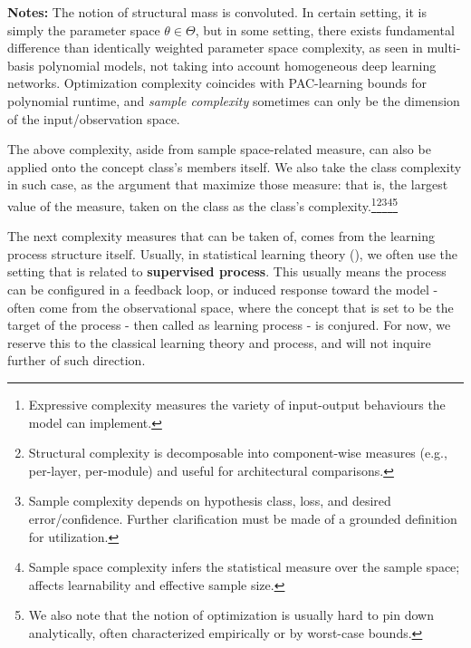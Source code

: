\documentclass[10pt]{article} %
\begin{document}
\begin{table}[htb]
\begin{threeparttable}
    \begin{tablenotes}
      \footnotesize
      \item[] \textbf{Notes:} The notion of structural mass is convoluted. In certain setting, it is simply the parameter space $\theta\in\Theta$, but in some setting, there exists fundamental difference than identically weighted parameter space complexity, as seen in multi-basis polynomial models, not taking into account homogeneous deep learning networks. Optimization complexity coincides with PAC-learning bounds for polynomial runtime, and \textit{sample complexity} sometimes can only be the dimension of the input/observation space.
    \end{tablenotes}
  \end{threeparttable}
\end{table}

The above complexity, aside from sample space-related measure, can also be applied onto the concept class's members itself. We also take the class complexity in such case, as the argument that maximize those measure: that is, the largest value of the measure, taken on the class as the class's complexity.\footnote{Expressive complexity measures the variety of input-output behaviours the model can implement.}\footnote{Structural complexity is decomposable into component-wise measures (e.g., per-layer, per-module) and useful for architectural comparisons.}\footnote{Sample complexity depends on hypothesis class, loss, and desired error/confidence. Further clarification must be made of a grounded definition for utilization.}\footnote{Sample space complexity infers the statistical measure over the sample space; affects learnability and effective sample size.}\footnote{We also note that the notion of optimization is usually hard to pin down analytically, often characterized empirically or by worst-case bounds.}

The next complexity measures that can be taken of, comes from the learning process structure itself. Usually, in statistical learning theory (\cite{STL_Hajek_Maxim_2021,10.5555/2371238,10.5555/2621980}), we often use the setting that is related to \textbf{supervised process}. This usually means the process can be configured in a feedback loop, or induced response toward the model - often come from the observational space, where the concept that is set to be the target of the process - then called as learning process - is conjured. For now, we reserve this to the classical learning theory and process, and will not inquire further of such direction. 
\end{document}
